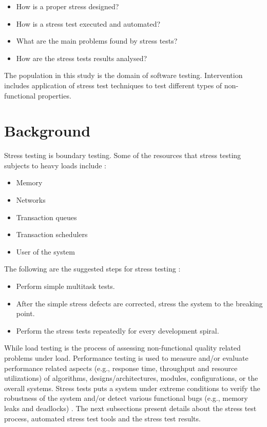 \begin{itemize}
\item How is a proper stress designed?
\item How is a stress test executed and automated?
\item What are the main problems found by stress tests?
\item How are the stress tests results analysed?
\end{itemize}

The population in this study is the domain of software testing. Intervention includes application of stress test techniques to test different types of non-functional properties.


\section{Background}


Stress testing is boundary testing. Some of the resources that stress testing subjects to heavy loads include \cite{Lewis2005}:

\begin{itemize}
\item Memory
\item Networks
\item Transaction queues
\item Transaction schedulers
\item User of the system
\end{itemize}

The following are the suggested steps for stress testing \cite{Lewis2005}:

\begin{itemize}
\item Perform simple multitask tests.
\item After the simple stress defects are corrected, stress the system to
the breaking point.
\item Perform the stress tests repeatedly for every development spiral.
\end{itemize}

While load testing is the process of assessing non-functional quality related problems under load. Performance testing is used to measure and/or evaluate performance
related aspects (e.g., response time, throughput and resource utilizations) of algorithms, designs/architectures, modules, configurations, or the overall systems. Stress tests puts a system under extreme conditions to verify the robustness of the system and/or detect various functional bugs (e.g., memory leaks and deadlocks) \cite{Afzal2009a}. The next subsections present details about the stress test process, automated stress test tools and the stress test results.

